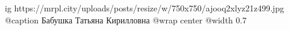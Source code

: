  
 
 
 
 

\ifcmt
  ig https://mrpl.city/uploads/posts/resize/w/750x750/ajooq2xlyz21z499.jpg
	@caption Бабушка Татьяна Кирилловна
  @wrap center
  @width 0.7
\fi
